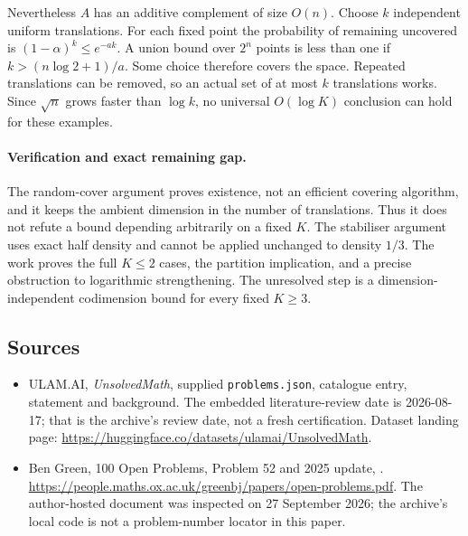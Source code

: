 \documentclass[11pt,a4paper]{article}
\begin{document}
Nevertheless $A$ has an additive complement of size $O(n)$. Choose $k$ independent uniform translations. For each fixed point the probability of remaining uncovered is $(1-\alpha)^k\leq e^{-ak}$. A union bound over $2^n$ points is less than one if $k>(n\log2+1)/a$. Some choice therefore covers the space. Repeated translations can be removed, so an actual set of at most $k$ translations works. Since $\sqrt n$ grows faster than $\log k$, no universal $O(\log K)$ conclusion can hold for these examples.

\paragraph{Verification and exact remaining gap.}
The random-cover argument proves existence, not an efficient covering algorithm, and it keeps the ambient dimension in the number of translations. Thus it does not refute a bound depending arbitrarily on a fixed $K$. The stabiliser argument uses exact half density and cannot be applied unchanged to density $1/3$. The work proves the full $K\leq2$ cases, the partition implication, and a precise obstruction to logarithmic strengthening. The unresolved step is a dimension-independent codimension bound for every fixed $K\geq3$.

\subsection{Sources}

{\small

\begin{itemize}

\item[\hypertarget{source:statement:1}{S1}] ULAM.AI, \emph{UnsolvedMath}, supplied \texttt{problems.json}, catalogue entry, statement and background. The embedded literature-review date is 2026-08-17; that is the archive’s review date, not a fresh certification. Dataset landing page: \url{https://huggingface.co/datasets/ulamai/UnsolvedMath}.

\item[\hypertarget{source:statement:2}{S2}] Ben Green, 100 Open Problems, Problem 52 and 2025 update, . \url{https://people.maths.ox.ac.uk/greenbj/papers/open-problems.pdf}. The author-hosted document was inspected on 27 September 2026; the archive’s local code is not a problem-number locator in this paper.

\end{itemize}

}

\label{end:statement}
\end{document}
